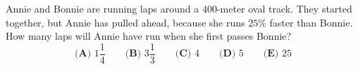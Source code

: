 Annie and Bonnie are running laps around a $400$-meter oval track. They started together, but Annie has pulled ahead, because she runs $25\%$ faster than Bonnie. How many laps will Annie have run when she first passes Bonnie?
\[
\textbf{(A) }1\dfrac{1}{4}\qquad\textbf{(B) }3\dfrac{1}{3}\qquad\textbf{(C) }4\qquad\textbf{(D) }5\qquad\textbf{(E) }25
\]
